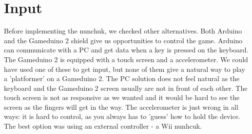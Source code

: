 \section{Input}
Before implementing the nunchuk, we checked other alternatives. Both Arduino and the Gameduino 2 shield give us opportunities to control the game. Arduino can communicate with a PC and get data when a key is pressed on the keyboard. The Gameduino 2 is equipped with a touch screen and a accelerometer. We could have used one of these to get input, but none of them give a natural way to play a 'platformer' on a Gameduino 2. The PC solution does not feel natural as the keyboard and the Gameduino 2 screen usually are not in front of each other. The touch screen is not as responsive as we wanted and it would be hard to see the screen as the fingers will get in the way. The accelerometer is just wrong in all ways: it is hard to control, as you always has to 'guess' how to hold the device. The best option was using an external controller - a Wii nunhcuk.



